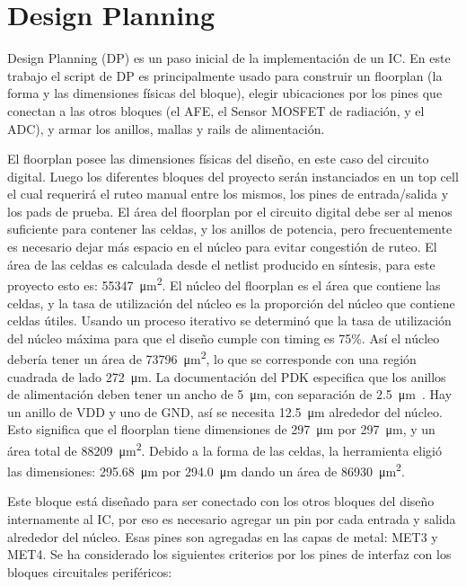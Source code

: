 \documentclass[a4paper, twoside, 11pt]{report}
\begin{document}
\FloatBarrier
\section{Design Planning}

Design Planning (DP) es un paso inicial de la implementación de un IC. En este trabajo el script de DP es principalmente usado para construir un floorplan (la forma y las dimensiones físicas del bloque), elegir ubicaciones por los pines que conectan a las otros bloques (el AFE, el Sensor MOSFET de radiación, y el ADC), y armar los anillos, mallas y rails de alimentación.

El floorplan posee las dimensiones físicas del diseño, en este caso del circuito digital. Luego los diferentes bloques del proyecto serán instanciados en un top cell el cual requerirá el ruteo manual entre los mismos, los pines de entrada/salida y los pads de prueba. El área del floorplan por el circuito digital debe ser al menos suficiente para contener las celdas, y los anillos de potencia, pero frecuentemente es necesario dejar más espacio en el núcleo para evitar congestión de ruteo. El área de las celdas es calculada desde el netlist producido en síntesis, para este proyecto esto es: \SI{55347}{\micro\meter\squared}. El núcleo del floorplan es el área que contiene las celdas, y la tasa de utilización del núcleo es la proporción del núcleo que contiene celdas útiles. Usando un proceso iterativo se determinó que la tasa de utilización del núcleo máxima para que el diseño cumple con timing es 75\%. Así el núcleo debería tener un área de \SI{73796}{\micro\meter\squared}, lo que se corresponde con una región cuadrada de lado \SI{272}{\micro\meter}. La documentación del PDK especifica que los anillos de alimentación deben tener un ancho de \SI{5}{\micro\meter}, con separación de \SI{2.5}{\micro\meter}~\cite{dig_imp_guidelines}. Hay un anillo de VDD y uno de GND, así se necesita \SI{12.5}{\micro\meter} alrededor del núcleo. Esto significa que el floorplan tiene dimensiones de \SI{297}{\micro\meter} por \SI{297}{\micro\meter}, y un área total de \SI{88209}{\micro\meter\squared}. Debido a la forma de las celdas, la herramienta eligió las dimensiones: \SI{295.68}{\micro\meter} por \SI{294.0}{\micro\meter} dando un área de \SI{86930}{\micro\meter\squared}.

Este bloque está diseñado para ser conectado con los otros bloques del diseño internamente al IC, por eso es necesario agregar un pin por cada entrada y salida alrededor del núcleo. Esas pines son agregadas en las capas de metal: MET3 y MET4. Se ha considerado los siguientes criterios por los pines de interfaz con los bloques circuitales periféricos:
\end{document}
